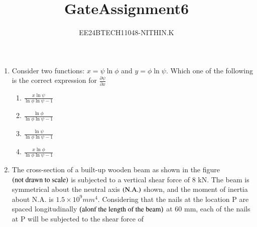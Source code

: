 \documentclass[journal]{IEEEtran}
\numberwithin{equation}{enumi}
\numberwithin{figure}{enumi}
\begin{document}


\title{GateAssignment6}
\author{EE24BTECH11048-NITHIN.K} 
{\let\newpage\relax\maketitle}
\begin{enumerate}
\section{Q.26 to Q.55 carry two marks each}
\item Consider two functions: $x = \psi\ln{\phi}$ and $y = \phi\ln{\psi}$. Which one of the following is the correct expression for $\frac{\partial \psi}{\partial x}$
	\begin{enumerate}
		\item $\frac{x\ln{\psi}}{\ln{\phi}\ln{\psi} - 1}$
		\item $\frac{\ln{\phi}}{\ln{\phi}\ln{\psi} - 1}$
		\item $\frac{\ln{\psi}}{\ln{\phi}\ln{\psi} - 1}$
		\item $\frac{x\ln{\phi}}{\ln{\phi}\ln{\psi} - 1}$
	\end{enumerate}
\item The cross-section of a built-up wooden beam as shown in the figure $\left(\text{not drawn to scale}\right)$ is subjected to a vertical shear force of 8 kN. The beam is symmetrical about the neutral axis $\left(\text{N.A.}\right)$ shown, and the moment of inertia about N.A. is $1.5\times 10^9 {mm}^4$. Considering that the nails at the location P are spaced longitudinally $\left(\text{alonf the length of the beam}\right)$ at 60 mm, each of the nails at P will be subjected to the shear force of
	\begin{figure}[H]
		\centering
\end{figure}
\end{enumerate}
\end{document}
